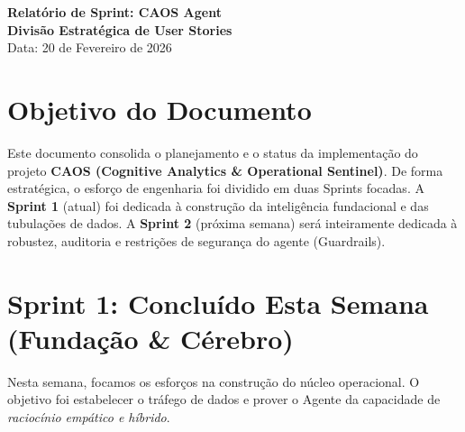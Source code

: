 \documentclass[11pt,a4paper]{article}
\begin{document}
\begin{center}
    \vspace*{1cm}
    {\Huge \textbf{\color{vivaBlue} Relatório de Sprint: CAOS Agent}}\\[0.5cm]
    {\large \textbf{Divisão Estratégica de User Stories}}\\[0.2cm]
    {\normalsize \textcolor{vivaGray}{Data: 20 de Fevereiro de 2026}}\\[1cm]
\end{center}

\section*{Objetivo do Documento}
Este documento consolida o planejamento e o status da implementação do projeto \textbf{CAOS (Cognitive Analytics \& Operational Sentinel)}. De forma estratégica, o esforço de engenharia foi dividido em duas Sprints focadas. A \textbf{Sprint 1} (atual) foi dedicada à construção da inteligência fundacional e das tubulações de dados. A \textbf{Sprint 2} (próxima semana) será inteiramente dedicada à robustez, auditoria e restrições de segurança do agente (Guardrails).

\vspace{0.5cm}

\section{Sprint 1: Concluído Esta Semana (Fundação \& Cérebro)}
Nesta semana, focamos os esforços na construção do núcleo operacional. O objetivo foi estabelecer o tráfego de dados e prover o Agente da capacidade de \textit{raciocínio empático e híbrido}.
\end{document}
